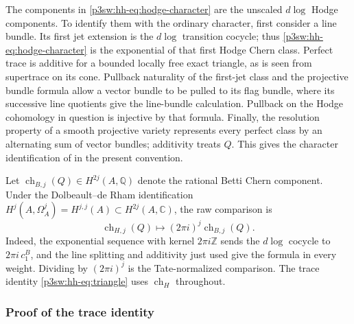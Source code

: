 \documentclass[11pt]{article}
\numberwithin{equation}{section}
\begin{document}
The components in \eqref{p3sw:hh-eq:hodge-character} are the
unscaled \(d\log\) Hodge components.  To identify them with the ordinary
character, first consider a line bundle.  Its first jet extension is
the \(d\log\) transition cocycle; thus \eqref{p3sw:hh-eq:hodge-character} is the exponential
of that first Hodge Chern class.  Perfect trace is additive for a
bounded locally free exact triangle, as is seen from supertrace on
its cone.  Pullback naturality of the first-jet class and the
projective bundle formula allow a vector bundle to be pulled to its
flag bundle, where its successive line quotients give the line-bundle
calculation.  Pullback on the Hodge cohomology in question is
injective by that formula.  Finally, the resolution property of a
smooth projective variety represents every perfect class by an
alternating sum of vector bundles; additivity treats \(Q\).
This gives the character identification of
\cite[Theorem~4.5]{P3HHCaldararuII} in the present convention.

Let
\(\operatorname{ch}_{B,j}(Q)\in H^{2j}(A,\mathbb Q)\) denote the
rational Betti Chern component.  Under the Dolbeault--de Rham
identification
\(H^j(A,\Omega_A^j)=H^{j,j}(A)\subset H^{2j}(A,\mathbb C)\),
the raw comparison is
\begin{equation}
 \operatorname{ch}_{H,j}(Q)
       \longmapsto (2\pi i)^j\operatorname{ch}_{B,j}(Q).
\label{p3sw:hh-eq:tate-normalization}
\end{equation}
Indeed, the exponential sequence with kernel \(2\pi i\mathbb Z\)
sends the \(d\log\) cocycle to \(2\pi i\,c_1^B\), and the line
splitting and additivity just used give the formula in every weight.
Dividing by \((2\pi i)^j\) is the Tate-normalized comparison.  The trace identity
\eqref{p3sw:hh-eq:triangle} uses \(\operatorname{ch}_H\) throughout.

\subsubsection{Proof of the trace identity}
\end{document}
